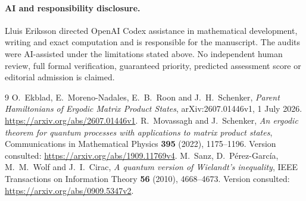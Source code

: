 \documentclass[11pt,a4paper]{article}
\begin{document}
\paragraph{AI and responsibility disclosure.}
Lluis Eriksson directed OpenAI Codex assistance in mathematical development, writing and exact computation and is responsible for the manuscript. The audits were AI-assisted under the limitations stated above. No independent human review, full formal verification, guaranteed priority, predicted assessment score or editorial admission is claimed.

\begin{thebibliography}{9}
O.~Ekblad, E.~Moreno-Nadales, E.~B.~Roon and J.~H.~Schenker,
\emph{Parent Hamiltonians of Ergodic Matrix Product States},
arXiv:2607.01446v1, 1 July 2026.
\url{https://arxiv.org/abs/2607.01446v1}.
R.~Movassagh and J.~Schenker,
\emph{An ergodic theorem for quantum processes with applications to matrix product states},
Communications in Mathematical Physics \textbf{395} (2022), 1175--1196.
Version consulted: \url{https://arxiv.org/abs/1909.11769v4}.
M.~Sanz, D.~P\'erez-Garc\'ia, M.~M.~Wolf and J.~I.~Cirac,
\emph{A quantum version of Wielandt's inequality},
IEEE Transactions on Information Theory \textbf{56} (2010), 4668--4673.
Version consulted: \url{https://arxiv.org/abs/0909.5347v2}.
\end{thebibliography}
\end{document}

